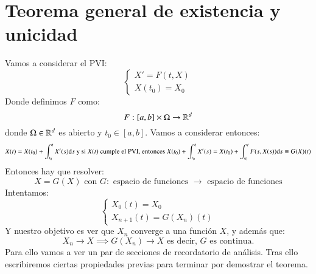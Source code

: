 
\chapter{Teorema general de existencia y unicidad}
Vamos a considerar el PVI:
$$
    \begin{cases}
        X' = F(t, X)\\
        X(t_0) = X_0
    \end{cases}
$$
Donde definimos $F$ como:
$$
    F: [a, b] \times \Omega \to \mathbb{R}^d
$$
donde $\Omega \in \mathbb{R}^d$ es abierto y $t_0 \in [a, b]$. Vamos a considerar entonces:
$$
    X(t) = X(t_0) + \int_{t_0}^t X'(s) \mathrm{d} s \text{ y si $X(t)$ cumple el PVI, entonces } X(t_0) + \int_{t_0}^t X'(s) = X(t_0) + \int_{t_0}^t F(s, X(s)) \mathrm{d} s \equiv G(X)(t)
$$
Entonces hay que resolver:
$$
    X = G(X) \text{ con $G :$ espacio de funciones $\to$ espacio de funciones}
$$
Intentamos:
$$
    \begin{cases}
        X_0(t) = X_0\\
        X_{n+1}(t) = G(X_n)(t)
    \end{cases}
$$
Y nuestro objetivo es ver que $X_n$ converge a una función $X$, y además que:
$$
    X_n \to X \implies G(X_n) \to X \text{ es decir, } G \text{ es continua.}
$$
Para ello vamos a ver un par de secciones de recordatorio de análisis. Tras ello escribiremos ciertas propiedades previas para terminar por demostrar el teorema.
